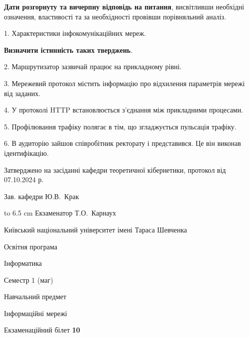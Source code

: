 \documentclass[12pt, ukrainian]{article}
\begin{document}
{
\qquad\textbf{Дати розгорнуту та вичерпну відповідь на питання}, висвітливши необхідні означення, властивості та за необхідності провівши порівняльний аналіз.

1. Характеристики інфокомунікаційних мереж.



\qquad\textbf{Визначити істинність таких тверджень}.

2. Маршрутизатор зазвичай працює на прикладному рівні.


3. Мережевий протокол містить інформацію про відхилення параметрів мережі від заданих.


4. У протоколі HTTP встановлюється з'єднання між прикладними процесами.


5. Профілювання трафіку полягає в тім, що згладжується пульсація трафіку.


6. В аудиторію зайшов співробітник ректорату і представився. Це він виконав ідентифікацію.

}
{\smallskip\smallskip \begin {scriptsize} Затверджено на засіданні кафедри теоретичної кібернетики, протокол   від   07.10.2024 р.\par\smallskip\smallskip\smallskip\smallskip
{\parbox {6.5 cm} {Зав. кафедри \dotfill Ю.В.~Крак}}\hspace {0.7cm} {\hbox to 6.5 cm { Екзаменатор \dotfill Т.О.~Карнаух}} \end{scriptsize}}
\newpage
{{\begin {scriptsize}\par
{ \center  Київський національний університет імені Тараса Шевченка \par}
{\parbox {5 cm}{Освітня програма \hfill}{\parbox {7 cm}{Інформатика\hfill}}\parbox {6 cm}{\hfill Семестр 1 (маг)}}\par
{\parbox {5 cm} {Навчальний предмет \hfill}\parbox {7 cm}{Інформаційні мережі \hfill}\parbox {6cm}{\hfill}\par}\vspace{-15pt} \end{scriptsize}}{\center Екзаменаційний білет \No \textbf { 10 }\par}}
\end{document}
